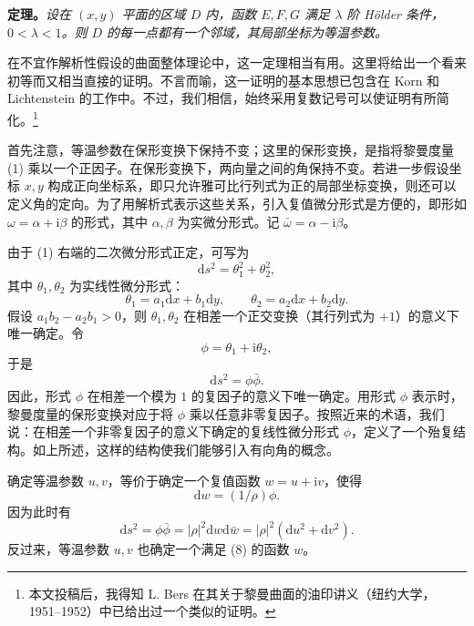 \documentclass[UTF8,a4paper,11pt,fontset=fandol]{ctexart}
\newcommand{\dd}{\mathrm d}
\newcommand{\ii}{\mathrm i}
\begin{document}
\textbf{定理。}\textit{设在 $(x,y)$ 平面的区域 $D$ 内，函数 $E,F,G$ 满足 $\lambda$ 阶 Hölder 条件，$0<\lambda<1$。则 $D$ 的每一点都有一个邻域，其局部坐标为等温参数。}

在不宜作解析性假设的曲面整体理论中，这一定理相当有用。这里将给出一个看来初等而又相当直接的证明。不言而喻，这一证明的基本思想已包含在 Korn 和 Lichtenstein 的工作中。不过，我们相信，始终采用复数记号可以使证明有所简化。\footnote{本文投稿后，我得知 L. Bers 在其关于黎曼曲面的油印讲义（纽约大学，1951--1952）中已给出过一个类似的证明。}

首先注意，等温参数在保形变换下保持不变；这里的保形变换，是指将黎曼度量 (1) 乘以一个正因子。在保形变换下，两向量之间的角保持不变。若进一步假设坐标 $x,y$ 构成正向坐标系，即只允许雅可比行列式为正的局部坐标变换，则还可以定义角的定向。为了用解析式表示这些关系，引入复值微分形式是方便的，即形如 $\omega=\alpha+\ii\beta$ 的形式，其中 $\alpha,\beta$ 为实微分形式。记 $\bar\omega=\alpha-\ii\beta$。

由于 (1) 右端的二次微分形式正定，可写为
\begin{equation}\dd s^2=\theta_1^2+\theta_2^2,\tag{4}\end{equation}
其中 $\theta_1,\theta_2$ 为实线性微分形式：
\begin{equation}\theta_1=a_1\dd x+b_1\dd y,\qquad\theta_2=a_2\dd x+b_2\dd y.\tag{5}\end{equation}
假设 $a_1b_2-a_2b_1>0$，则 $\theta_1,\theta_2$ 在相差一个正交变换（其行列式为 $+1$）的意义下唯一确定。令
\begin{equation}\phi=\theta_1+\ii\theta_2,\tag{6}\end{equation}
于是
\begin{equation}\dd s^2=\phi\bar\phi.\tag{7}\end{equation}
因此，形式 $\phi$ 在相差一个模为 $1$ 的复因子的意义下唯一确定。用形式 $\phi$ 表示时，黎曼度量的保形变换对应于将 $\phi$ 乘以任意非零复因子。按照近来的术语，我们说：在相差一个非零复因子的意义下确定的复线性微分形式 $\phi$，定义了一个殆复结构。如上所述，这样的结构使我们能够引入有向角的概念。

确定等温参数 $u,v$，等价于确定一个复值函数 $w=u+\ii v$，使得
\begin{equation}\dd w=(1/\rho)\phi.\tag{8}\end{equation}
因为此时有
\begin{equation}\dd s^2=\phi\bar\phi=|\rho|^2\dd w\dd\bar w=|\rho|^2(\dd u^2+\dd v^2).\tag{9}\end{equation}
反过来，等温参数 $u,v$ 也确定一个满足 (8) 的函数 $w$。
\end{document}

